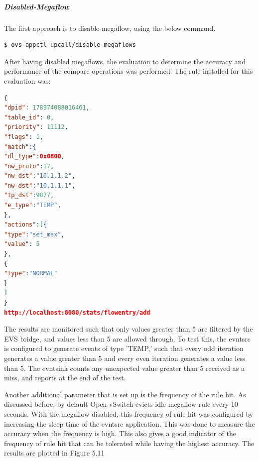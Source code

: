 \subparagraph*{Disabled-Megaflow}
The first approach is to disable-megaflow, using the below command.

 \begin{lstlisting}[language=bash]
$ ovs-appctl upcall/disable-megaflows \end{lstlisting}

After having disabled megaflows, the evaluation to determine the accuracy and performance of the compare operations was performed. The rule installed for this evaluation was:

\begin{lstlisting}[language=json,firstnumber=1]
{
"dpid": 178974088016461,
"table_id": 0,
"priority": 11112,
"flags": 1,
"match":{
"dl_type":0x0800,
"nw_proto":17,
"nw_dst":"10.1.1.2",
"nw_dst":"10.1.1.1",
"tp_dst":9877,
"e_type":"TEMP",
},
"actions":[{
"type":"set_max",
"value": 5
},
{
"type":"NORMAL"
}
]
}
http://localhost:8080/stats/flowentry/add \end{lstlisting}

The results are monitored such that only values greater than 5 are filtered by the EVS bridge, and values less than 5 are allowed through. To test this, the evntsrc is configured to generate events of type 'TEMP,' such that every odd iteration generates a value greater than 5 and every even iteration generates a value less than 5. The evntsink counts any unexpected value greater than 5 received as a miss, and reports at the end of the test. 

Another additional parameter that is set up is the frequency of the rule hit. As discussed before, by default Open vSwitch evicts idle megaflow rule every 10 seconds. With the megaflow disabled, this frequency of rule hit was configured by increasing the sleep time of the evntsrc application. This was done to measure the accuracy when the frequency is high. This also gives a good indicator of the frequency of rule hit that can be tolerated while having the highest accuracy. The results are plotted in Figure 5.11


